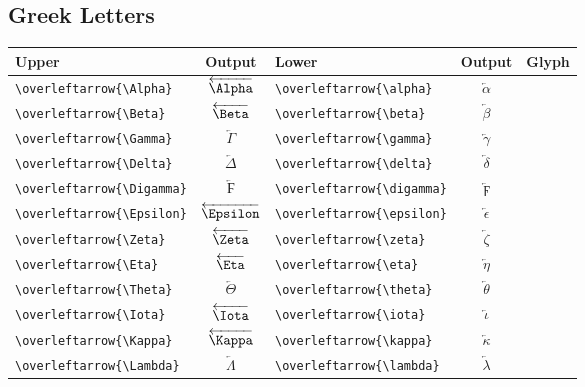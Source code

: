 \documentclass[12pt,a4paper]{article}
\begin{document}
\subsection*{Greek Letters}
\begin{longtable}{|l|c|l|c|c|}
\hline
\textbf{Upper}                     & \textbf{Output}               & \textbf{Lower}                     & \textbf{Output}               & \textbf{Glyph} \\
\hline
\verb|\overleftarrow{\Alpha}|      & $\overleftarrow{\Alpha}$      & \verb|\overleftarrow{\alpha}|      & $\overleftarrow{\alpha}$      & \\
\verb|\overleftarrow{\Beta}|       & $\overleftarrow{\Beta}$       & \verb|\overleftarrow{\beta}|       & $\overleftarrow{\beta}$       & \\
\verb|\overleftarrow{\Gamma}|      & $\overleftarrow{\Gamma}$      & \verb|\overleftarrow{\gamma}|      & $\overleftarrow{\gamma}$      & \\
\verb|\overleftarrow{\Delta}|      & $\overleftarrow{\Delta}$      & \verb|\overleftarrow{\delta}|      & $\overleftarrow{\delta}$      & \\
\verb|\overleftarrow{\Digamma}|    & $\overleftarrow{\Digamma}$    & \verb|\overleftarrow{\digamma}|    & $\overleftarrow{\digamma}$    & \\
\verb|\overleftarrow{\Epsilon}|    & $\overleftarrow{\Epsilon}$    & \verb|\overleftarrow{\epsilon}|    & $\overleftarrow{\epsilon}$    & \\
\verb|\overleftarrow{\Zeta}|       & $\overleftarrow{\Zeta}$       & \verb|\overleftarrow{\zeta}|       & $\overleftarrow{\zeta}$       & \\
\verb|\overleftarrow{\Eta}|        & $\overleftarrow{\Eta}$        & \verb|\overleftarrow{\eta}|        & $\overleftarrow{\eta}$        & \\
\verb|\overleftarrow{\Theta}|      & $\overleftarrow{\Theta}$      & \verb|\overleftarrow{\theta}|      & $\overleftarrow{\theta}$      & \\
\verb|\overleftarrow{\Iota}|       & $\overleftarrow{\Iota}$       & \verb|\overleftarrow{\iota}|       & $\overleftarrow{\iota}$       & \\
\verb|\overleftarrow{\Kappa}|      & $\overleftarrow{\Kappa}$      & \verb|\overleftarrow{\kappa}|      & $\overleftarrow{\kappa}$      & \\
\verb|\overleftarrow{\Lambda}|     & $\overleftarrow{\Lambda}$     & \verb|\overleftarrow{\lambda}|     & $\overleftarrow{\lambda}$     & \\

\end{longtable}
\end{document}
